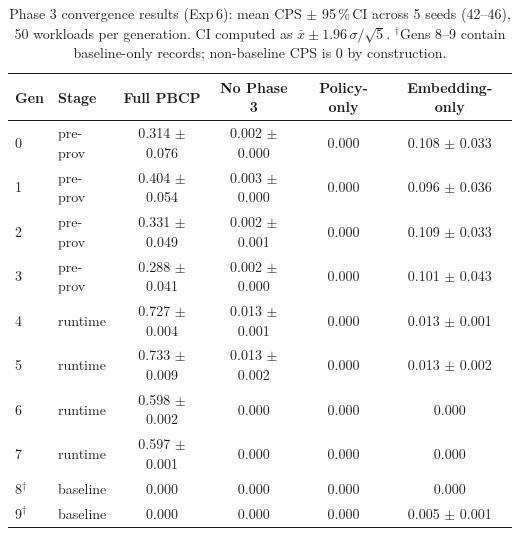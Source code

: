 \begin{table}[t]
\centering
\caption{Phase 3 convergence results (Exp\,6): mean CPS $\pm$ 95\,\%\,CI across 5 seeds (42--46), 50 workloads per generation. CI computed as $\bar{x} \pm 1.96\,\sigma/\sqrt{5}$. $^\dagger$Gens 8--9 contain baseline-only records; non-baseline CPS is 0 by construction.}
\label{tab:convergence}
\begin{tabular}{llcccc}
\toprule
Gen & Stage & Full PBCP & No Phase 3 & Policy-only & Embedding-only \\
\midrule
0 & pre-prov & 0.314 $\pm$ 0.076 & 0.002 $\pm$ 0.000 & 0.000 & 0.108 $\pm$ 0.033 \\
1 & pre-prov & 0.404 $\pm$ 0.054 & 0.003 $\pm$ 0.000 & 0.000 & 0.096 $\pm$ 0.036 \\
2 & pre-prov & 0.331 $\pm$ 0.049 & 0.002 $\pm$ 0.001 & 0.000 & 0.109 $\pm$ 0.033 \\
3 & pre-prov & 0.288 $\pm$ 0.041 & 0.002 $\pm$ 0.000 & 0.000 & 0.101 $\pm$ 0.043 \\
\midrule
4 & runtime & 0.727 $\pm$ 0.004 & 0.013 $\pm$ 0.001 & 0.000 & 0.013 $\pm$ 0.001 \\
5 & runtime & 0.733 $\pm$ 0.009 & 0.013 $\pm$ 0.002 & 0.000 & 0.013 $\pm$ 0.002 \\
6 & runtime & 0.598 $\pm$ 0.002 & 0.000 & 0.000 & 0.000 \\
7 & runtime & 0.597 $\pm$ 0.001 & 0.000 & 0.000 & 0.000 \\
\midrule
8$^\dagger$ & baseline & 0.000 & 0.000 & 0.000 & 0.000 \\
9$^\dagger$ & baseline & 0.000 & 0.000 & 0.000 & 0.005 $\pm$ 0.001 \\
\bottomrule
\end{tabular}
\end{table}